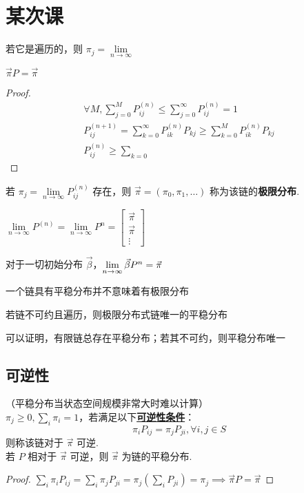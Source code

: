 \documentclass[./main.tex]{subfiles}
\begin{document}
\section{某次课}

\begin{enumerate*}
    \item 若它是遍历的，则 $\pi_j=\lim\limits_{n\rightarrow\infty}$
\end{enumerate*}
$\vec{\pi} P=\vec{\pi}$
\begin{proof}
    \begin{align*}
    \forall M,\sum_{j=0}^{M}P_{ij}^{(n)}\le\sum_{j=0}^{\infty}P_{ij}^{(n)}=1\\
    P_{ij}^{(n+1)}=\sum_{k=0}^{\infty}P_{ik}^{(n)}P_{kj}\ge\sum_{k=0}^MP_{ik}^{(n)}P_{kj}\\
    P_{ij}^{(n)}\ge\sum_{k=0}
    \end{align*}
\end{proof}
若 $\pi_j=\lim\limits_{n\rightarrow\infty}P_{ij}^{(n)}$ 存在，则 $\vec{\pi}=(\pi_0,\pi_1,\dots)$ 称为该链的\textbf{极限分布}. \\
\begin{enumerate*}
    \item $\lim\limits_{n\rightarrow\infty}P^{(n)}=\lim\limits_{n\rightarrow\infty}P^n=\begin{bmatrix}\vec{\pi}\\\vec{\pi}\\\vdots\end{bmatrix}$
    \item 对于一切初始分布 $\vec{\beta}$，$\lim\limits_{n\rightarrow\infty}\vec\beta P^n=\vec{\pi}$
    \item 一个链具有平稳分布并不意味着有极限分布
    \item 若链不可约且遍历，则极限分布式链唯一的平稳分布
    \item 可以证明，有限链总存在平稳分布；若其不可约，则平稳分布唯一
\end{enumerate*}
\subsection{可逆性}
（平稳分布当状态空间规模非常大时难以计算）\\
$\pi_j\ge 0,\sum_i\pi_i=1$，若满足以下\underline{\textbf{可逆性条件}}：
\begin{equation}
    \pi_iP_{ij}=\pi_jP_{ji},\forall i,j\in S
\end{equation}
则称该链对于 $\vec{\pi}$ 可逆. \\
若 $P$ 相对于 $\vec{\pi}$ 可逆，则 $\vec{\pi}$ 为链的平稳分布. 
\begin{proof}
    $\sum_i\pi_iP_{ij}=\sum_i\pi_jP_{ji}=\pi_j(\sum_{i}P_{ji})=\pi_j\implies\vec{\pi}P=\vec{\pi}$
\end{proof}
\end{document}
